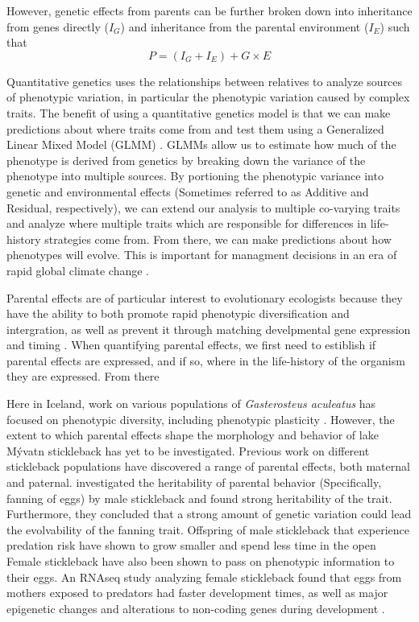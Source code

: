 \documentclass[12pt]{extarticle}
\begin{document}
However, genetic effects from parents can be further broken down into inheritance from genes directly ($I_G$) and inheritance from the parental environment ($I_E$) such that $$P = (I_G + I_E) + G \times E$$

Quantitative genetics uses the relationships between relatives to analyze sources of phenotypic variation, in particular the phenotypic variation caused by complex traits.
The benefit of using a quantitative genetics model is that we can make predictions about where traits come from and test them using a Generalized Linear Mixed Model (GLMM) \citep{Wilson2010, Bolker2009, VanDooren2016}. GLMMs allow us to estimate how much of the phenotype is derived from genetics by breaking down the variance of the phenotype into multiple sources. By portioning the phenotypic variance into genetic and environmental effects (Sometimes referred to as Additive and Residual, respectively), we can extend our analysis to multiple co-varying traits and analyze where multiple traits which are responsible for differences in life-history strategies come from. From there, we can make predictions about how phenotypes will evolve. This is important for managment decisions in an era of rapid global climate change \citep{VanDooren2016}.

Parental effects are of particular interest to evolutionary ecologists because they have the ability to both promote rapid phenotypic diversification and intergration, as well as prevent it through matching develpmental gene expression and timing \citep{Badyaev2009}. When quantifying parental effects, we first need to estiblish if parental effects are expressed, and if so, where in the life-history of the organism they are expressed. From there

Here in Iceland, work on various populations of \textit{Gasterosteus aculeatus} has focused on phenotypic diversity, including phenotypic plasticity \citep{Kristjansson2002, Millet2013}. However, the extent to which parental effects shape the morphology and behavior of lake M\'yvatn stickleback has yet to be investigated. Previous work on different stickleback populations have discovered a range of parental effects, both maternal and paternal. \citet{Bell2018} investigated the heritability of parental behavior (Specifically, fanning of eggs) by male stickleback and found strong heritability of the trait. Furthermore, they concluded that a strong amount of genetic variation could lead the evolvability of the fanning trait. Offspring of male stickleback that experience predation risk have shown to grow smaller and spend less time in the open \citep{Bell2016, Stein2014} Female stickleback have also been shown to pass on phenotypic information to their eggs. An RNAseq study analyzing female stickleback found that eggs from mothers exposed to predators had faster development times, as well as major epigenetic changes and alterations to non-coding genes during development \citep{Mommer2014, Bell2016}.  \\
\end{document}
